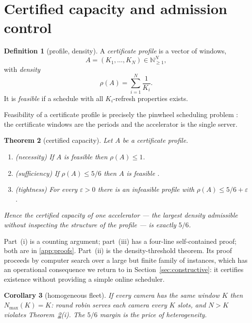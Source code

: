 \documentclass[final,5p,times,twocolumn]{elsarticle}
\newtheorem{theorem}{Theorem}
\newtheorem{corollary}[theorem]{Corollary}
\theoremstyle{definition}
\newtheorem{definition}[theorem]{Definition}
\newcommand{\Nc}{N}
\newcommand{\Ki}{K_i}
\newcommand{\dens}{\rho}
\begin{document}
\section{Certified capacity and admission control}\label{sec:capacity}

\begin{definition}[profile, density]\label{def:profile}
A \emph{certificate profile} is a vector of windows,
\[
A=(K_1,\dots,K_\Nc)\in\mathbb{N}_{\ge1}^{\Nc},
\]
with \emph{density}
\[
\dens(A)=\sum_{i=1}^{\Nc}\frac{1}{\Ki}.
\]
It is \emph{feasible} if a schedule with all $\Ki$-refresh properties exists.
\end{definition}

Feasibility of a certificate profile is precisely the pinwheel scheduling problem
\cite{holte1989pinwheel}: the certificate windows are the periods and the accelerator is the
single server.

\begin{theorem}[certified capacity]\label{thm:capacity}
Let $A$ be a certificate profile.
\begin{enumerate}
\item[(i)] (necessity) If $A$ is feasible then $\dens(A)\le1$.
\item[(ii)] (sufficiency) If $\dens(A)\le 5/6$ then $A$ is feasible \cite{kawamura2024stoc,kawamura2026pnas}.
\item[(iii)] (tightness) For every $\varepsilon>0$ there is an infeasible profile with
      $\dens(A)\le 5/6+\varepsilon$.
\end{enumerate}
Hence the \emph{certified capacity} of one accelerator --- the largest density admissible without
inspecting the structure of the profile --- is exactly $5/6$.
\end{theorem}

Part~(i) is a counting argument; part~(iii) has a four-line self-contained proof; both are in
\ref{app:proofs}. Part~(ii) is the density-threshold theorem. Its proof proceeds by computer
search over a large but finite family of instances, which has an operational consequence we return
to in Section~\ref{sec:constructive}: it certifies existence without providing a simple online
scheduler.

\begin{corollary}[homogeneous fleet]\label{cor:homog}
If every camera has the same window $K$ then $N_{\max}(K)=K$: round robin serves each camera every
$K$ slots, and $N>K$ violates Theorem~\ref{thm:capacity}(i). The $5/6$ margin is the price of
heterogeneity.
\end{corollary}
\end{document}
